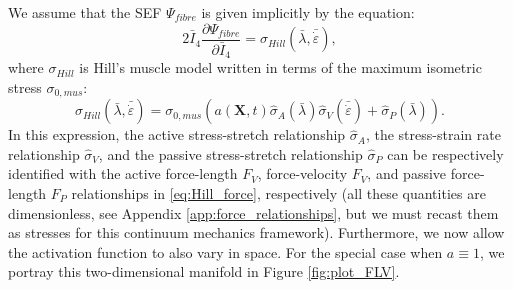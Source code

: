 \documentclass{sfuthesis}
\numberwithin{equation}{section}
\numberwithin{figure}{chapter}
\numberwithin{table}{chapter}
\theoremstyle{definition}
\def\*#1{{\mathbf{#1}}} %
\newcommand{\pder}[2]{\dfrac{\partial #1}{\partial #2}}
\newcommand{\depsilon}{\dot{\varepsilon}}
\newcommand{\I}{{\bar{I}}}
\begin{document}
We assume that the SEF $\Psi_{fibre}$ is given implicitly by the equation:
\begin{equation} \label{eq:ode_fibre_sef}
    2 \I_4 \pder{\Psi_{fibre}}{\I_4} = \sigma_{Hill}(\bar{\lambda}, \bar{\depsilon}),
\end{equation}
where $\sigma_{Hill}$ is Hill's muscle model written in terms of the maximum isometric stress $\sigma_{0,mus}$:
\begin{equation} \label{eq:def_hill_stress_sigma}
    \sigma_{Hill}(\bar{\lambda}, \bar{\depsilon}) = \sigma_{0,mus} \left( a(\*X,t) \widehat{\sigma}_A(\bar{\lambda}) \widehat{\sigma}_V(\bar{\depsilon}) + \widehat{\sigma}_P(\bar{\lambda}) \right).
\end{equation}
In this expression, the active stress-stretch relationship $\widehat{\sigma}_A$, the stress-strain rate relationship $\widehat{\sigma}_V$, and the passive stress-stretch relationship $\widehat{\sigma}_P$ can be respectively identified with the active force-length $F_V$, force-velocity $F_V$, and passive force-length $F_P$ relationships in \eqref{eq:Hill_force}, respectively (all these quantities are dimensionless, see Appendix \ref{app:force_relationships}, but we must recast them as stresses for this continuum mechanics framework). Furthermore, we now allow the activation function to also vary in space. For the special case when $a \equiv 1$, we portray this two-dimensional manifold in Figure \ref{fig:plot_FLV}.

\end{document}
